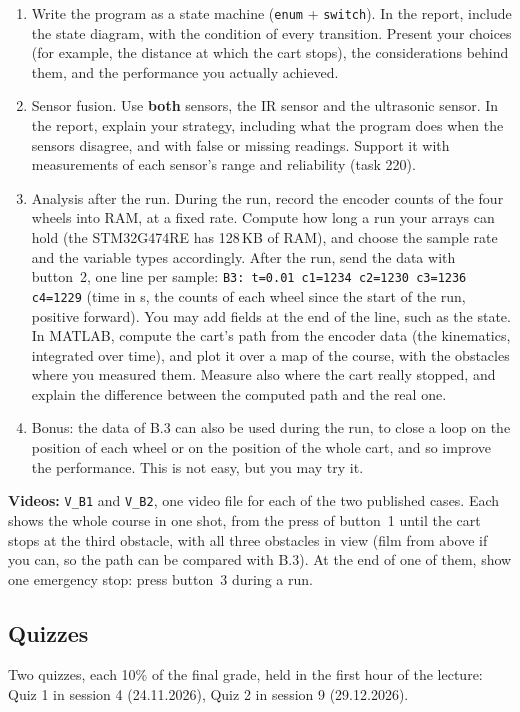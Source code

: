 \documentclass[11pt,a4paper]{article}
\begin{document}
\begin{enumerate}[label=B.\arabic*, leftmargin=2.2em]
  \item Write the program as a state machine (\texttt{enum} + \texttt{switch}). In the report, include the state
        diagram, with the condition of every transition. Present your choices (for example, the distance at which the
        cart stops), the considerations behind them, and the performance you actually achieved.
  \item Sensor fusion. Use \textbf{both} sensors, the IR sensor and the ultrasonic sensor. In the report, explain your
        strategy, including what the program does when the sensors disagree, and with false or missing readings.
        Support it with measurements of each sensor's range and reliability (task 220).
  \item Analysis after the run. During the run, record the encoder counts of the four wheels into RAM, at a fixed
        rate. Compute how long a run your arrays can hold (the STM32G474RE has 128\,KB of RAM), and choose the sample
        rate and the variable types accordingly. After the run, send the data with button~2, one line per sample:
        \texttt{B3: t=0.01 c1=1234 c2=1230 c3=1236 c4=1229} (time in s, the counts of each wheel since the start of the
        run, positive forward). You may add fields at the end of the line, such as the state. In MATLAB, compute the
        cart's path from the encoder data (the kinematics, integrated over time), and plot it over a map of the
        course, with the obstacles where you measured them. Measure also where the cart really stopped, and explain the
        difference between the computed path and the real one.
  \item Bonus: the data of B.3 can also be used during the run, to close a loop on the position of each wheel or on
        the position of the whole cart, and so improve the performance. This is not easy, but you may try it.
\end{enumerate}

\noindent\textbf{Videos:} \texttt{V\_B1} and \texttt{V\_B2}, one video file for each of the two published cases. Each
shows the whole course in one shot, from the press of button~1 until the cart stops at the third obstacle, with all
three obstacles in view (film from above if you can, so the path can be compared with B.3). At the end of one of them,
show one emergency stop: press button~3 during a run.


\subsection{Quizzes}
Two quizzes, each 10\% of the final grade, held in the first hour of the lecture: Quiz 1 in session 4 (24.11.2026), Quiz 2 in session 9 (29.12.2026).
\end{document}
